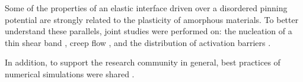 \documentclass{goose-article}
\begin{document}
Some of the properties of an elastic interface driven over a disordered pinning potential are strongly related to the plasticity of amorphous materials.
To better understand these parallels, joint studies were performed on: the nucleation of a thin shear band \cite{Popovic2018}, creep flow \cite{Popovic2021b,Popovic2021a}, and the distribution of activation barriers \cite{Ji2022,Ji2020,Ji2019}.

In addition, to support the research community in general, best practices of numerical simulations were shared \cite{deGeus2023}.

\renewcommand{\refname}{Output -- Scientific publications}
\renewcommand\bibsection{\section{\refname}}


\end{document}
